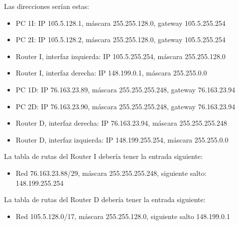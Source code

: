 \documentclass[letterpaper,10pt,spanish]{sphinxmanual}
\begin{document}
\sphinxAtStartPar
Las direcciones serían estas:
\begin{itemize}
\item {} 
\sphinxAtStartPar
PC 1I: IP 105.5.128.1, máscara 255.255.128.0, gateway 105.5.255.254

\item {} 
\sphinxAtStartPar
PC 2I: IP 105.5.128.2, máscara 255.255.128.0, gateway 105.5.255.254

\item {} 
\sphinxAtStartPar
Router I, interfaz izquierda: IP 105.5.255.254, máscara 255.255.128.0

\item {} 
\sphinxAtStartPar
Router I, interfaz derecha: IP 148.199.0.1, máscara 255.255.0.0

\item {} 
\sphinxAtStartPar
PC 1D: IP 76.163.23.89, máscara 255.255.255.248, gateway 76.163.23.94

\item {} 
\sphinxAtStartPar
PC 2D: IP 76.163.23.90, máscara 255.255.255.248, gateway 76.163.23.94

\item {} 
\sphinxAtStartPar
Router D, interfaz derecha: IP 76.163.23.94, máscara 255.255.255.248

\item {} 
\sphinxAtStartPar
Router D, interfaz izquierda: IP 148.199.255.254, máscara 255.255.0.0

\end{itemize}

\sphinxAtStartPar
La tabla de rutas del Router I debería tener la entrada siguiente:
\begin{itemize}
\item {} 
\sphinxAtStartPar
Red 76.163.23.88/29, máscara 255.255.255.248, siguiente salto: 148.199.255.254

\end{itemize}

\sphinxAtStartPar
La tabla de rutas del Router D debería tener la entrada siguiente:
\begin{itemize}
\item {} 
\sphinxAtStartPar
Red 105.5.128.0/17, máscara 255.255.128.0, siguiente salto 148.199.0.1

\end{itemize}
\end{document}
